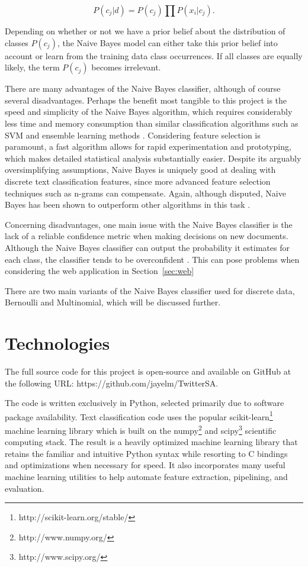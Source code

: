 \documentclass[letter,12pt]{article}
\begin{document}
\begin{equation}
  P(c_j | d) = P(c_j) \prod P(x_i | c_j).
\end{equation}

Depending on whether or not we have a prior belief about the distribution of
classes $P(c_j)$, the Naive Bayes model can either take this prior belief into
account or learn from the training data class occurrences. If all classes are
equally likely, the term $P(c_j)$ becomes irrelevant.

There are many advantages of the Naive Bayes classifier, although of course
several disadvantages. Perhaps the benefit most tangible to this project is the
speed and simplicity of the Naive Bayes algorithm, which requires considerably
less time and memory consumption than similar classification algorithms such as
SVM and ensemble learning methods \cite{huang03}. Considering feature selection
is paramount, a fast algorithm allows for rapid experimentation and
prototyping, which makes detailed statistical analysis substantially easier.
Despite its arguably oversimplifying assumptions, Naive Bayes is uniquely good
at dealing with discrete text classification features, since more advanced
feature selection techniques such as n-grams can compensate. Again, although
disputed, Naive Bayes has been shown to outperform other algorithms in this
task \cite{narayanan13,pak10}.

Concerning disadvantages, one main issue with the Naive Bayes classifier is the
lack of a reliable confidence metric when making decisions on new documents.
Although the Naive Bayes classifier can output the probability it estimates for
each class, the classifier tends to be overconfident \cite{rennie01}. This can
pose problems when considering the web application in Section~\ref{sec:web}

There are two main variants of the Naive Bayes classifier used for
discrete data, Bernoulli and Multinomial, which will be discussed further.

\section{Technologies}

The full source code for this project is open-source and available on GitHub at the following
URL:
https://github.com/jayelm/TwitterSA.

The code is written exclusively in Python, selected primarily due to software
package availability. Text classification code uses the popular
scikit-learn\footnote{http://scikit-learn.org/stable/} machine learning library
which is built on the numpy\footnote{http://www.numpy.org/} and
scipy\footnote{http://www.scipy.org/} scientific computing stack. The result is
a heavily optimized machine learning library that retains the familiar and
intuitive Python syntax while resorting to C bindings and optimizations when
necessary for speed. It also incorporates many useful machine learning
utilities to help automate feature extraction, pipelining, and evaluation.
\end{document}
